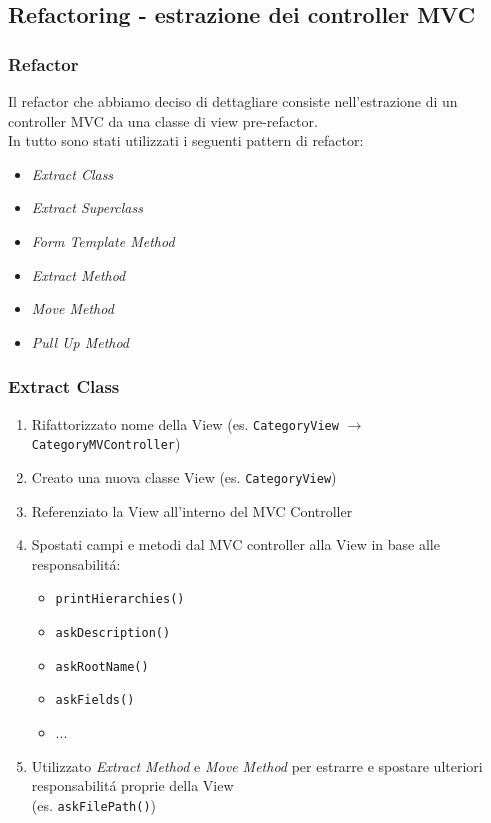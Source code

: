 \subsection{Refactoring - estrazione dei controller MVC}
\beamertitle

\begin{frame}
    \frametitle{Refactor}
    Il refactor che abbiamo deciso di dettagliare consiste nell'estrazione di
    un controller MVC da una classe di view pre-refactor.
    \\
    \medskip
    In tutto sono stati utilizzati i seguenti pattern di refactor:
    \begin{itemize}
        \item \emph{Extract Class}
        \item \emph{Extract Superclass}
        \item \emph{Form Template Method}
        \item \emph{Extract Method}
        \item \emph{Move Method}
        \item \emph{Pull Up Method}
    \end{itemize}
\end{frame}

\begin{frame}
    \frametitle{Extract Class}
    \begin{enumerate}
        \item Rifattorizzato nome della View (es. \texttt{CategoryView} $\to$ \texttt{CategoryMVController})
        \item Creato una nuova classe View (es. \texttt{CategoryView})
        \item Referenziato la View all'interno del MVC Controller
        \item Spostati campi e metodi dal MVC controller alla View in base alle responsabilitá:
          \begin{itemize}
              \item \texttt{printHierarchies()}
              \item \texttt{askDescription()}
              \item \texttt{askRootName()}
              \item \texttt{askFields()}
              \item ...
          \end{itemize}
        \item Utilizzato \emph{Extract Method} e \emph{Move Method} per estrarre e spostare ulteriori responsabilitá proprie della View
              \\(es. \texttt{askFilePath()})
    \end{enumerate}
\end{frame}

